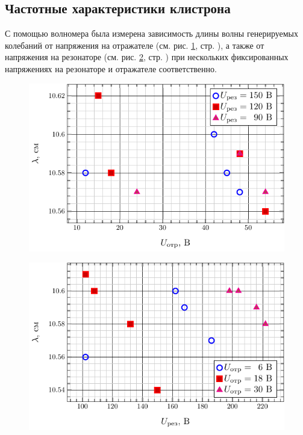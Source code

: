\documentclass[a4paper,14pt]{extarticle}
\begin{document}
\subsection{Частотные характеристики клистрона}
С помощью волномера была измерена зависимость длины волны генерируемых колебаний  от напряжения на отражателе (см. рис. \ref{ris:5}, стр. \pageref{ris:5}), а также от напряжения на резонаторе (см. рис. \ref{ris:6}, стр. \pageref{ris:6}) при нескольких фиксированных напряжениях на резонаторе и отражателе соответственно.
\begin{figure}[H]
    \centering
    \includegraphics[scale=1.4]{fig2/l_from_uo.pdf}
    \caption{}
    \label{ris:5}
\end{figure}
\begin{figure}[H]
    \centering
    \includegraphics[scale=1.4]{fig2/l_from_ur.pdf}
    \caption{}
    \label{ris:6}
\end{figure}
\end{document}
